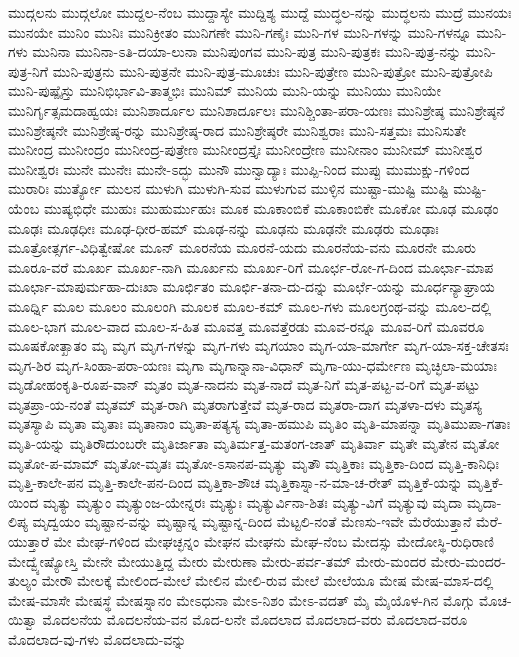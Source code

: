 {ಮುದ್ಗಲನು
ಮುದ್ಗಲೋ
ಮುದ್ದಲ-ನೆಂಬ
ಮುದ್ದಾಸ್ಯೇ
ಮುದ್ದಿಶ್ಯ
ಮುದ್ದೆ
ಮುದ್ಧಲ-ನನ್ನು
ಮುದ್ಧಲನು
ಮುದ್ರೆ
ಮುನಯಃ
ಮುನಯೇ
ಮುನಿಂ
ಮುನಿಃ
ಮುನಿಕ್ರೀತಂ
ಮುನಿಗಣೇ
ಮುನಿ-ಗಣೈಃ
ಮುನಿ-ಗಳ
ಮುನಿ-ಗಳನ್ನು
ಮುನಿ-ಗಳನ್ನೂ
ಮುನಿ-ಗಳು
ಮುನಿನಾ
ಮುನಿನಾ-ಽತಿ-ದಯಾ-ಲುನಾ
ಮುನಿಪುಂಗವ
ಮುನಿ-ಪುತ್ರ
ಮುನಿ-ಪುತ್ರಕಃ
ಮುನಿ-ಪುತ್ರ-ನನ್ನು
ಮುನಿ-ಪುತ್ರ-ನಿಗೆ
ಮುನಿ-ಪುತ್ರನು
ಮುನಿ-ಪುತ್ರನೇ
ಮುನಿ-ಪುತ್ರ-ಮೂಚುಃ
ಮುನಿ-ಪುತ್ರೇಣ
ಮುನಿ-ಪುತ್ರೋ
ಮುನಿ-ಪುತ್ರೋಪಿ
ಮುನಿ-ಪುಷ್ಪೈಸ್ತು
ಮುನಿಭಿರ್ಭಾವಿ-ತಾತ್ಮಭಿಃ
ಮುನಿಮ್
ಮುನಿಯ
ಮುನಿ-ಯನ್ನು
ಮುನಿಯು
ಮುನಿಯೇ
ಮುನಿರ್ಗೃತ್ಸಮದಾಹ್ವಯಃ
ಮುನಿಶಾರ್ದೂಲ
ಮುನಿಶಾರ್ದೂಲಃ
ಮುನಿಶ್ಚಿಂತಾ-ಪರಾ-ಯಣಃ
ಮುನಿಶ್ರೇಷ್ಠ
ಮುನಿಶ್ರೇಷ್ಠನೆ
ಮುನಿಶ್ರೇಷ್ಠನೇ
ಮುನಿಶ್ರೇಷ್ಠ-ರನ್ನು
ಮುನಿಶ್ರೇಷ್ಠ-ರಾದ
ಮುನಿಶ್ರೇಷ್ಠರೇ
ಮುನಿಶ್ವರಾಃ
ಮುನಿ-ಸತ್ತಮಃ
ಮುನಿಸುತೇ
ಮುನೀಂದ್ರ
ಮುನೀಂದ್ರಂ
ಮುನೀಂದ್ರ-ಪುತ್ರೇಣ
ಮುನೀಂದ್ರಸ್ತೈಃ
ಮುನೀಂದ್ರೇಣ
ಮುನೀನಾಂ
ಮುನೀಮ್
ಮುನೀಶ್ವರ
ಮುನೀಶ್ವರಃ
ಮುನೇ
ಮುನೇಃ
ಮುನೇ-ಽದ್ಭು
ಮುನೌ
ಮುನ್ವಾದ್ಯಾಃ
ಮುಪ್ಪಿ-ನಿಂದ
ಮುಪ್ಪು
ಮುಮುಕ್ಷು-ಗಳಿಂದ
ಮುರಾರಿಃ
ಮುರ್ತ್ಯೋ
ಮುಲನ
ಮುಳುಗಿ
ಮುಳುಗಿ-ಸುವ
ಮುಳುಗುವ
ಮುಳ್ಳಿನ
ಮುಷ್ಟಾ-ಮುಷ್ಟಿ
ಮುಷ್ಟಿ
ಮುಷ್ಟಿ-ಯೆಂಬ
ಮುಷ್ಯಭಿಧೇ
ಮುಹುಃ
ಮುಹುರ್ಮುಹುಃ
ಮೂಕ
ಮೂಕಾಂಬಿಕೆ
ಮೂಕಾಂಬಿಕೇ
ಮೂಕೋ
ಮೂಢ
ಮೂಢಂ
ಮೂಢಃ
ಮೂಢಧೀಃ
ಮೂಢ-ಧೀರ-ಹಮ್
ಮೂಢ-ನನ್ನು
ಮೂಢನು
ಮೂಢನೇ
ಮೂಢರು
ಮೂಢಾಃ
ಮೂತ್ರೋತ್ಸರ್ಗ-ವಿಧಿತ್ವೇಷೋ
ಮೂನ್
ಮೂರನೆಯ
ಮೂರನೆ-ಯದು
ಮೂರನೆಯ-ವನು
ಮೂರನೇ
ಮೂರು
ಮೂರೂ-ವರೆ
ಮೂರ್ಖ
ಮೂರ್ಖ-ನಾಗಿ
ಮೂರ್ಖನು
ಮೂರ್ಖ-ರಿಗೆ
ಮೂರ್ಛ-ರೋ-ಗ-ದಿಂದ
ಮೂರ್ಛಾ-ಮಾಪ
ಮೂರ್ಛಾ-ಮಾಪುರ್ಮಹಾ-ದುಃಖಾ
ಮೂರ್ಛಿತಂ
ಮೂರ್ಛಿ-ತನಾ-ದು-ದನ್ನು
ಮೂರ್ಛೆ-ಯನ್ನು
ಮೂರ್ಧನ್ಯಾಘ್ರಾಯ
ಮೂರ್ಧ್ನಿ
ಮೂಲ
ಮೂಲಂ
ಮೂಲಂಗಿ
ಮೂಲಕ
ಮೂಲ-ಕಮ್
ಮೂಲ-ಗಳು
ಮೂಲಗ್ರಂಥ-ವನ್ನು
ಮೂಲ-ದಲ್ಲಿ
ಮೂಲ-ಭಾಗ
ಮೂಲ-ವಾದ
ಮೂಲ-ಸ-ಹಿತ
ಮೂವತ್ತ
ಮೂವತ್ತೆರಡು
ಮೂವ-ರನ್ನೂ
ಮೂವ-ರಿಗೆ
ಮೂವರೂ
ಮೂಷಕೋತ್ಖಾತಂ
ಮೃ
ಮೃಗ
ಮೃಗ-ಗಳನ್ನು
ಮೃಗ-ಗಳು
ಮೃಗಯಾಂ
ಮೃಗ-ಯಾ-ಮಾರ್ಗೇ
ಮೃಗ-ಯಾ-ಸಕ್ತ-ಚೇತಸಃ
ಮೃಗ-ಶಿರ
ಮೃಗ-ಸಿಂಹಾ-ಪರಾ-ಯಣಃ
ಮೃಗಾ
ಮೃಗಾನ್ನಾನಾ-ವಿಧಾನ್
ಮೃಗಾ-ಯು-ಧರ್ಮೇಣ
ಮೃಚ್ಛಿಲಾ-ಮಯಾಃ
ಮೃಡೋಹಂಕೃತಿ-ರೂಪ-ವಾನ್
ಮೃತಂ
ಮೃತ-ನಾದನು
ಮೃತ-ನಾದೆ
ಮೃತ-ನಿಗೆ
ಮೃತ-ಪಟ್ಟ-ವ-ರಿಗೆ
ಮೃತ-ಪಟ್ಟು
ಮೃತಪ್ರಾ-ಯ-ನಂತೆ
ಮೃತಮ್
ಮೃತ-ರಾಗಿ
ಮೃತರಾಗುತ್ತೇವೆ
ಮೃತ-ರಾದ
ಮೃತರಾ-ದಾಗ
ಮೃತಳಾ-ದಳು
ಮೃತಸ್ಯ
ಮೃತಸ್ಯಾಪಿ
ಮೃತಾ
ಮೃತಾಃ
ಮೃತಾನಾಂ
ಮೃತಾ-ಪತ್ಯಸ್ಯ
ಮೃತಾ-ಹಮುಪಿ
ಮೃತಿಂ
ಮೃತಿ-ಮಾಪನ್ನಾ
ಮೃತಿಮುಪಾ-ಗತಾಃ
ಮೃತಿ-ಯನ್ನು
ಮೃತಿರೌದುಂಬರೇ
ಮೃತಿರ್ಜಾತಾ
ಮೃತಿರ್ಮತ್ತ-ಮತಂಗ-ಜಾತ್
ಮೃತಿರ್ವಾ
ಮೃತೇ
ಮೃತೇನ
ಮೃತೋ
ಮೃತೋ-ಪ-ಮಾಮ್
ಮೃತೋ-ಮೃತಃ
ಮೃತೋ-ಽಸಾನಪ-ಮೃತ್ಯು
ಮೃತೌ
ಮೃತ್ತಿಕಾಃ
ಮೃತ್ತಿಕಾ-ದಿಂದ
ಮೃತ್ತಿ-ಕಾನಿಧಿಃ
ಮೃತ್ತಿ-ಕಾಲೇ-ಪನ
ಮೃತ್ತಿ-ಕಾಲೇ-ಪನ-ದಿಂದ
ಮೃತ್ತಿಕಾ-ಶೌಚ
ಮೃತ್ತಿಕಾಸ್ನಾ-ನ-ಮಾ-ಚ-ರೇತ್
ಮೃತ್ತಿಕೆ-ಯನ್ನು
ಮೃತ್ತಿಕೆ-ಯಿಂದ
ಮೃತ್ಯು
ಮೃತ್ಯುಂ
ಮೃತ್ಯುಂಜ-ಯೇನ್ನರಃ
ಮೃತ್ಯುಃ
ಮೃತ್ಯುರ್ವಿನಾ-ಶಿತಃ
ಮೃತ್ಯು-ವಿಗೆ
ಮೃತ್ಯುವು
ಮೃದಾ
ಮೃದಾ-ಲಿಪ್ಯ
ಮೃದ್ವಯಂ
ಮೃಷ್ಟಾನ-ವನ್ನು
ಮೃಷ್ಟಾನ್ನ
ಮೃಷ್ಟಾನ್ನ-ದಿಂದ
ಮೆಟ್ಟಲಿ-ನಂತೆ
ಮೆಣಸು-ಇವೇ
ಮೆರೆಯುತ್ತಾನೆ
ಮೆರೆ-ಯುತ್ತಾರೆ
ಮೇ
ಮೇಘ-ಗಳಿಂದ
ಮೇಘಚ್ಛನ್ನಂ
ಮೇಘನ
ಮೇಘನು
ಮೇಘ-ನೆಂಬ
ಮೇದಸ್ಸು
ಮೇದೋಸ್ಥಿ-ರುಧಿರಾಣಿ
ಮೇದ್ವ್ಯೇಷ್ಯೋಸ್ತಿ
ಮೇನೇ
ಮೇಯುತ್ತಿದ್ದ
ಮೇರು
ಮೇರುಣಾ
ಮೇರು-ಪರ್ವ-ತಮ್
ಮೇರು-ಮಂದರ
ಮೇರು-ಮಂದರ-ತುಲ್ಯಂ
ಮೇರೌ
ಮೇಲಕ್ಕೆ
ಮೇಲಿಂದ-ಮೇಲೆ
ಮೇಲಿನ
ಮೇಲಿ-ರುವ
ಮೇಲೆ
ಮೇಲೆಯೂ
ಮೇಷ
ಮೇಷ-ಮಾಸ-ದಲ್ಲಿ
ಮೇಷ-ಮಾಸೇ
ಮೇಷಸ್ಥೆ
ಮೇಷಸ್ನಾನಂ
ಮೇಽಧುನಾ
ಮೇಽ-ನಿಶಂ
ಮೇಽ-ವದತ್
ಮೈ
ಮೈಯೊಳ-ಗಿನ
ಮೊಗ್ಗು
ಮೊಚ-ಯಿತ್ವಾ
ಮೊದಲನೆಯ
ಮೊದಲನೆಯ-ವನ
ಮೊದ-ಲನೇ
ಮೊದಲಾದ
ಮೊದಲಾದ-ವರು
ಮೊದಲಾದ-ವರೂ
ಮೊದಲಾದ-ವು-ಗಳು
ಮೊದಲಾದು-ವನ್ನು
}
